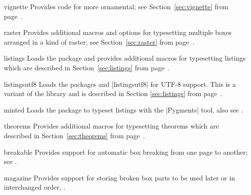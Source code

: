 {\begin{docTcbKey}[library]{vignette}{}{}
  Provides code for more ornamental; see
  Section~\ref{sec:vignette} from page~\pageref{sec:vignette}.
\end{docTcbKey}

\begin{docTcbKey}[library]{raster}{}{}
  Provides additional macros and options for typesetting multiple
  boxes arranged in a kind of raster;
  see Section~\ref{sec:raster} from page~\pageref{sec:raster}.
\end{docTcbKey}

\begin{docTcbKey}[library]{listings}{}{}
  Loads the package  \cite{hoffmann:listings} and provides additional
  macros for typesetting listings which are described in Section~\ref{sec:listings}
  from page~\pageref{sec:listings}.
\end{docTcbKey}

\begin{docTcbKey}[library]{listingsutf8}{}{}
  Loads the packages  \cite{hoffmann:listings} and
  |listingsutf8| \cite{oberdiek:listingsutf8} for UTF-8 support.
  This is a variant of the library 
  and is described in Section \ref{sec:listings}
  from page~\pageref{sec:listings}.
\end{docTcbKey}

\begin{docTcbKey}[library]{minted}{}{}
  Loads the package  \cite{poore:minted} to
  typeset listings with the |Pygments| \cite{pygments:web} tool,
  also see .
\end{docTcbKey}

\begin{docTcbKey}[library]{theorems}{}{}
  Provides additional
  macros for typesetting theorems which are described in Section~\ref{sec:theorems}
  from page~\pageref{sec:theorems}.
\end{docTcbKey}


\begin{docTcbKey}[library]{breakable}{}{}
  Provides support for automatic box breaking from one page to another;
  see .
\end{docTcbKey}

\begin{docTcbKey}[library]{magazine}{}{}
  Provides support for storing broken box parts to be used later or
  in interchanged order, .
\end{docTcbKey}

}
